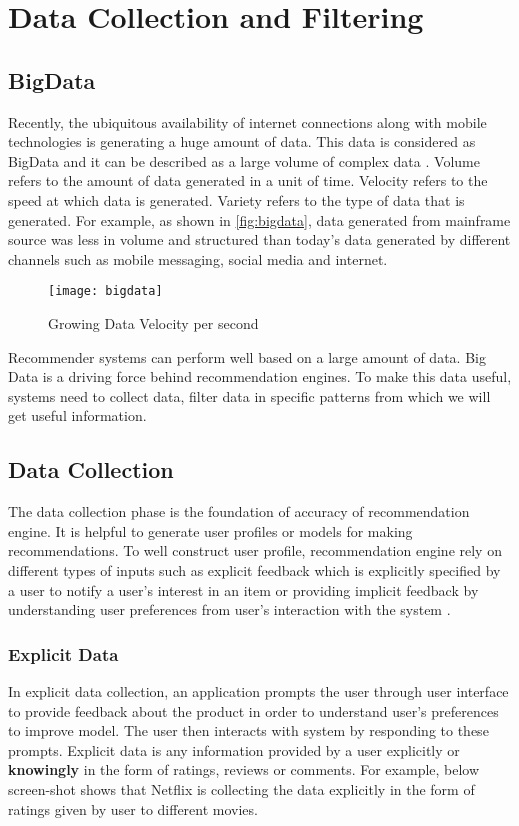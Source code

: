
\section{Data Collection and Filtering}
\subsection{BigData}
Recently, the ubiquitous availability of internet connections along with mobile technologies is generating a huge amount of data. This data is considered as BigData and it can be described as a large volume of complex data \cite{2}. Volume refers to the amount of data generated in a unit of time. Velocity refers to the speed at which data is generated. Variety refers to the type of data that is generated. For example, as shown in \autoref{fig:bigdata}, data generated from mainframe source was less in volume and structured than today's data generated by different channels such as mobile messaging, social media and internet.
\\
\begin{figure}[H]
	\centering
	\texttt{[image: bigdata]}
	\caption{Growing Data Velocity per second}
	\label{fig:bigdata}
\end{figure}

\noindent Recommender systems can perform well based on a large amount of data. Big Data is a driving force behind recommendation engines.
To make this data useful, systems need to collect data, filter data in specific patterns from which we will get useful information. 

\subsection{Data Collection}

The data collection phase is the foundation of accuracy of recommendation engine. It is helpful to generate user profiles or models for making recommendations. To well construct user profile, recommendation engine rely on different types of inputs such as explicit feedback which is explicitly specified by a user to notify a user's interest in an item or providing implicit feedback by understanding user preferences from user's interaction with the system \cite{34}. 

\subsubsection{Explicit Data}
In explicit data collection, an application prompts the user through user interface to provide feedback about the product in order to understand user's preferences to improve model. The user then interacts with system by responding to these prompts. Explicit data is any information provided by a user explicitly or \textbf{knowingly} in the form of ratings, reviews or comments. For example, below screen-shot shows that Netflix is collecting the data explicitly in the form of ratings given by user to different movies. 
\\

